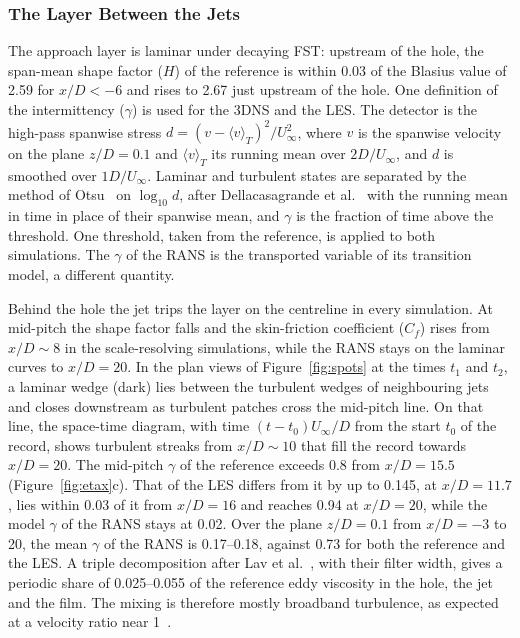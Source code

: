 \documentclass[colorlinks,upint,subscriptcorrection,varvw,hyphenate,balance,lineno]{asmeconf}
\newcommand*{\Uinf}{U_\infty}
\begin{document}
\subsubsection{The Layer Between the Jets}\label{sec:layer}

The approach layer is laminar under decaying FST: upstream of the hole, the span-mean shape factor ($H$) of the
reference is within 0.03 of the Blasius value of 2.59 for $x/D<-6$ and rises to 2.67 just upstream of the hole. One definition of the intermittency ($\gamma$) is used for the 3DNS and
the LES. The detector is the high-pass spanwise stress $d=(v-\langle v\rangle_T)^2/\Uinf^2$, where $v$ is the
spanwise velocity on the plane $z/D=0.1$ and $\langle v\rangle_T$ its running mean over $2D/\Uinf$, and $d$ is
smoothed over $1D/\Uinf$. Laminar and turbulent states are separated by the method of Otsu~\cite{otsu1979} on
$\log_{10}d$, after Dellacasagrande et al.~\cite{dellacasagrande2023} with the running mean in time in place of
their spanwise mean, and $\gamma$ is the fraction of time above the threshold. One threshold, taken from the
reference, is applied to both simulations. The $\gamma$ of the RANS is the transported variable of its transition
model, a different quantity.

Behind the hole the jet trips the layer on the centreline in every simulation. At mid-pitch the shape factor
falls and the skin-friction coefficient ($C_f$) rises from $x/D\sim8$ in the scale-resolving simulations, while
the RANS stays on the laminar curves to $x/D=20$. In the plan views of Figure~\ref{fig:spots} at the times $t_1$ and
$t_2$, a laminar wedge (dark) lies between the turbulent wedges of neighbouring jets and closes downstream as
turbulent patches cross the mid-pitch line. On that line, the space-time diagram, with time $(t-t_0)\Uinf/D$
from the start $t_0$ of the record, shows turbulent streaks from $x/D\sim10$ that fill the record towards
$x/D=20$. The mid-pitch $\gamma$ of the reference exceeds 0.8 from $x/D=15.5$ (Figure~\ref{fig:etax}c). That of
the LES differs from it by up to 0.145, at $x/D=11.7$, lies within 0.03 of it from $x/D=16$ and reaches 0.94 at
$x/D=20$, while the model $\gamma$ of the RANS stays at 0.02. Over the plane $z/D=0.1$ from $x/D=-3$ to 20, the
mean $\gamma$ of the RANS is 0.17--0.18, against 0.73 for both the reference and the LES. A triple decomposition after
Lav et al.~\cite{lav2019}, with their filter width, gives a periodic share of 0.025--0.055 of the reference eddy
viscosity in the hole, the jet and the film. The mixing is therefore mostly broadband turbulence, as expected at a
velocity ratio near 1~\cite{fawcett2013}.
\end{document}
